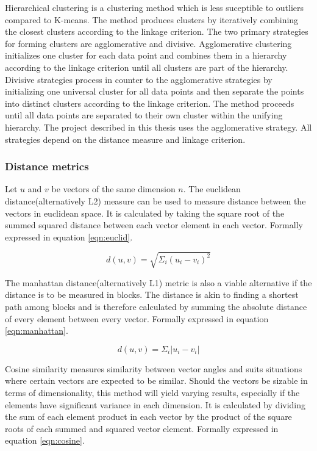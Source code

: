 Hierarchical clustering is a clustering method which is less suceptible to outliers compared to K-means. The method produces clusters by iteratively combining the closest clusters according to the linkage criterion. The two primary strategies for forming clusters are agglomerative and divisive. Agglomerative clustering initializes one cluster for each data point and combines them in a hierarchy according to the linkage criterion until all clusters are part of the hierarchy. Divisive strategies process in counter to the agglomerative strategies by initializing one universal cluster for all data points and then separate the points into distinct clusters according to the linkage criterion. The method proceeds until all data points are separated to their own cluster within the unifying hierarchy. The project described in this thesis uses the agglomerative strategy. All strategies depend on the distance measure and linkage criterion\cite{murtagh1983survey}.

\subsubsection{Distance metrics}
Let $u$ and $v$ be vectors of the same dimension $n$. The euclidean distance(alternatively L2) measure can be used to measure distance between the vectors in euclidean space. It is calculated by taking the square root of the summed squared distance between each vector element in each vector. Formally expressed in equation \ref{eqn:euclid}.

\begin{equation}
\label{eqn:euclid}
d(u, v) = \sqrt{\Sigma_i (u_i - v_i)^2} 
\end{equation}

The manhattan distance(alternatively L1) metric is also a viable alternative if the distance is to be measured in blocks. The distance is akin to finding a shortest path among blocks and is therefore calculated by summing the absolute distance of every element between every vector. Formally expressed in equation \ref{eqn:manhattan}.

\begin{equation}
\label{eqn:manhattan}
d(u, v) = \Sigma_i |u_i - v_i|
\end{equation}

Cosine similarity measures similarity between vector angles and suits situations where certain vectors are expected to be similar. Should the vectors be sizable in terms of dimensionality, this method will yield varying results, especially if the elements have significant variance in each dimension. It is calculated by dividing the sum of each element product in each vector by the product of the square roots of each summed and squared vector element. Formally expressed in equation \ref{eqn:cosine}.


